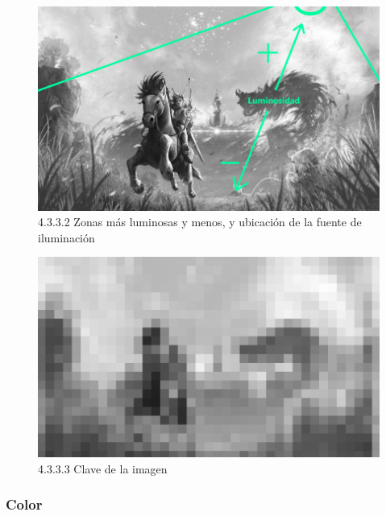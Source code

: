 \documentclass[12pt]{article}
\begin{document}
    \begin{figure}[H]
      \centering
      \includegraphics[scale=0.7]{images/Saúl/Sección 17/EA_img17_3Claroscuro_2Luminosidad.png}
      \caption{\small 4.3.3.2 Zonas más luminosas y menos, y ubicación de la fuente de iluminación}
    \end{figure}


    \begin{figure}[H]
      \centering
      \includegraphics[scale=0.7]{images/Saúl/Sección 17/EA_img17_3Claroscuro_3Clave.png}
      \caption{\small 4.3.3.3 Clave de la imagen}
    \end{figure}



        \subsubsection{Color}
\end{document}
